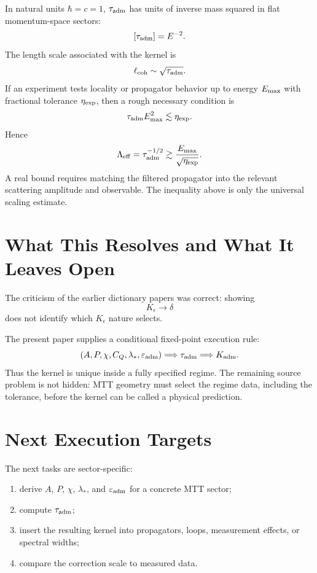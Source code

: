 \documentclass[11pt]{article}
\begin{document}
In natural units \(\hbar=c=1\), \(\tau_{\rm adm}\) has units of inverse mass squared in flat momentum-space sectors:
\[
[\tau_{\rm adm}]=E^{-2}.
\]
The length scale associated with the kernel is
\[
\ell_{\rm coh}\sim \sqrt{\tau_{\rm adm}}.
\]
If an experiment tests locality or propagator behavior up to energy \(E_{\rm max}\) with fractional tolerance \(\eta_{\rm exp}\), then a rough necessary condition is
\[
\tau_{\rm adm}E_{\rm max}^2\lesssim \eta_{\rm exp}.
\]
Hence
\[
\Lambda_{\rm eff}
=
\tau_{\rm adm}^{-1/2}
\gtrsim
\frac{E_{\rm max}}{\sqrt{\eta_{\rm exp}}}.
\]
A real bound requires matching the filtered propagator into the relevant scattering amplitude and observable. The inequality above is only the universal scaling estimate.

\section{What This Resolves and What It Leaves Open}

The criticism of the earlier dictionary papers was correct: showing
\[
K_\epsilon\to\delta
\]
does not identify which \(K_\epsilon\) nature selects.

The present paper supplies a conditional fixed-point execution rule:
\[
(A,P,\chi,C_Q,\lambda_\ast,\varepsilon_{\rm adm})
\Longrightarrow
\tau_{\rm adm}
\Longrightarrow
K_{\rm adm}.
\]
Thus the kernel is unique inside a fully specified regime. The remaining source problem is
not hidden: MTT geometry must select the regime data, including the tolerance, before the
kernel can be called a physical prediction.

\section{Next Execution Targets}

The next tasks are sector-specific:

\begin{enumerate}
\item derive \(A\), \(P\), \(\chi\), \(\lambda_\ast\), and \(\varepsilon_{\rm adm}\) for a concrete MTT sector;
\item compute \(\tau_{\rm adm}\);
\item insert the resulting kernel into propagators, loops, measurement effects, or spectral widths;
\item compare the correction scale to measured data.
\end{enumerate}
\end{document}
